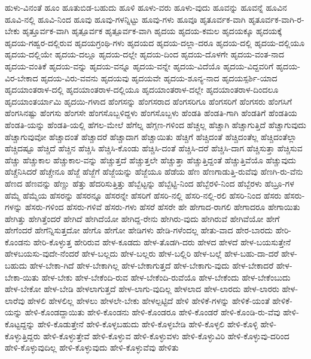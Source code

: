 {ಹುಳು-ವಿನಂತೆ
ಹೂಂ
ಹೂತುಬಿಡ-ಬಹುದು
ಹೂಳಿ
ಹೂಳು-ವರು
ಹೂಳು-ವುದು
ಹೂವನ್ನು
ಹೂವನ್ನೆ
ಹೂವಿನ
ಹೂವಿ-ನಲ್ಲಿ
ಹೂವಿ-ನಿಂದ
ಹೂವು
ಹೂವು-ಗಳನ್ನಿಟ್ಟು
ಹೂವು-ಗಳು
ಹೂವೂ
ಹೃತೂರ್ವಕ-ವಾಗಿ
ಹೃತೂರ್ವಕ-ವಾಗಿ-ರ-ಬೇಕು
ಹೃತ್ತೂರ್ವಕ-ವಾಗಿ
ಹೃತ್ಪೂರ್ವಕ
ಹೃತ್ಪೂರ್ವಕ-ವಾಗಿ
ಹೃದಯ
ಹೃದಯ-ಕಮಲ
ಹೃದಯಕ್ಕೂ
ಹೃದಯಕ್ಕೆ
ಹೃದಯ-ಗಹ್ವರ-ದಲ್ಲಿರುವ
ಹೃದಯಗ್ರಂಥಿ-ಗಳು
ಹೃದಯದ
ಹೃದಯ-ದಲ್ಲಾ-ದರೂ
ಹೃದಯ-ದಲ್ಲಿ
ಹೃದಯ-ದಲ್ಲಿಯೂ
ಹೃದಯ-ದಲ್ಲಿಯೇ
ಹೃದಯ-ದಲ್ಲೂ
ಹೃದಯ-ದಲ್ಲೇ
ಹೃದಯ-ದಿಂದ
ಹೃದಯ-ದೊಳಗೇ
ಹೃದಯ-ವಂತ-ನಾದ
ಹೃದಯ-ವಂತಿಕೆ
ಹೃದಯ-ವನ್ನು
ಹೃದಯ-ವನ್ನೂ
ಹೃದಯ-ವನ್ನೇ
ಹೃದಯ-ವಿದೆಯೊ
ಹೃದಯ-ವಿದ್ದವರಿಗೆ
ಹೃದಯ-ವಿರ-ಬೇಕಾದ
ಹೃದಯ-ವಿರು-ವವನು
ಹೃದಯವು
ಹೃದಯವೇ
ಹೃದಯ-ಶೂನ್ಯ-ನಾದ
ಹೃದಯಸ್ಪರ್ಶಿ-ಯಾದ
ಹೃದಯಾಂತರಾಳ-ದಲ್ಲಿ
ಹೃದಯಾಂತರಾಳ-ದಲ್ಲಿಯೂ
ಹೃದಯಾಂತರಾಳ-ದಲ್ಲೇ
ಹೃದಯಾಂತರಾಳ-ದಿಂದಲೂ
ಹೃದಯಾಂತರ್ಯಾಮಿ
ಹೃದಯಿ-ಗಳಾದ
ಹೆಂಗಸನ್ನು
ಹೆಂಗಸರಾದ
ಹೆಂಗಸರಿಗೂ
ಹೆಂಗಸರಿಗೆ
ಹೆಂಗಸರು
ಹೆಂಗಸಿಗೆ
ಹೆಂಗಸಿನಷ್ಟು
ಹೆಂಗಸು
ಹೆಂಗಸೇ
ಹೆಂಗಸೊಬ್ಬಳಿದ್ದಳು
ಹೆಂಗಸೊಬ್ಬಳು
ಹೆಂಡತಿ
ಹೆಂಡತಿ-ಗಾಗಿ
ಹೆಂಡತಿಗೆ
ಹೆಂಡತಿಯ
ಹೆಂಡತಿ-ಯನ್ನು
ಹೆಂಡತಿ-ಯಲ್ಲಿ
ಹೆಗಲ-ಮೇಲೆ
ಹೆಗೆಲ್ನ
ಹೆಗ್ಗಣ-ಗಳಿಂದ
ಹೆಚ್ಚಲ್ಲ
ಹೆಚ್ಚಾಗಿ
ಹೆಚ್ಚಾಗುತ್ತಿದೆ
ಹೆಚ್ಚಾಗುವುದು
ಹೆಚ್ಚಾಗುವುವೋ
ಹೆಚ್ಚಾದಂತೆ
ಹೆಚ್ಚಾದರೆ
ಹೆಚ್ಚಾದಾಗ
ಹೆಚ್ಚಾಯಿತು
ಹೆಚ್ಚಿಗೆ
ಹೆಚ್ಚಿದಂತೆ
ಹೆಚ್ಚಿದಂತೆಲ್ಲ
ಹೆಚ್ಚಿದಂತೆಲ್ಲಾ
ಹೆಚ್ಚಿದಷ್ಟೂ
ಹೆಚ್ಚಿದೆ
ಹೆಚ್ಚಿನ
ಹೆಚ್ಚಿಸಿ
ಹೆಚ್ಚಿಸಿ-ಕೊಂಡು
ಹೆಚ್ಚಿಸಿ-ದಂತೆ
ಹೆಚ್ಚಿಸಿ-ದರೆ
ಹೆಚ್ಚಿಸಿ-ದಾಗ
ಹೆಚ್ಚಿಸುತ್ತಾ
ಹೆಚ್ಚಿಸುವ
ಹೆಚ್ಚು
ಹೆಚ್ಚುಕಾಲ
ಹೆಚ್ಚುಕಾಲ-ವನ್ನು
ಹೆಚ್ಚುತ್ತದೆ
ಹೆಚ್ಚುತ್ತಲೇ
ಹೆಚ್ಚುತ್ತಾ
ಹೆಚ್ಚುತ್ತಿದ್ದಂತೆ
ಹೆಚ್ಚುತ್ತಿವೆಯೊ
ಹೆಚ್ಚುವುದು
ಹೆಚ್ಚೆನಿಸಿದರೆ
ಹೆಚ್ಚೇನೂ
ಹೆಜ್ಜೆ
ಹೆಜ್ಜೆಗೆ
ಹೆಜ್ಜೆಯನ್ನು
ಹೆಜ್ಜೆಯೂ
ಹೆಡೆಯ
ಹೆಣ
ಹೆಣಗಾಡುತ್ತಿ-ರುವೆವು
ಹೆಣಗಿ-ರು-ವೆನು
ಹೆಣದ
ಹೆಣವನ್ನು
ಹೆಣ್ಣು
ಹೆತ್ತು
ಹೆದರಿಸುತ್ತಿತ್ತು
ಹೆಬ್ಬೆಟ್ಟನ್ನು
ಹೆಬ್ಬೆಟ್ಟಿ-ನಿಂದ
ಹೆಬ್ಬೆರಳಿ-ನಿಂದ
ಹೆಬ್ಬೆರಳು
ಹೆಬ್ರೂ-ಗಳ
ಹೆಮ್ಮೆ
ಹೆಮ್ಮೆಯ
ಹೆಸರನ್ನು
ಹೆಸರನ್ನೂ
ಹೆಸರನ್ನೇ
ಹೆಸರಿಗೆ
ಹೆಸರಿ-ನಲ್ಲಿ
ಹೆಸರಿ-ನಲ್ಲಿ-ರಲಿ
ಹೆಸರಿ-ನಿಂದ
ಹೆಸರು
ಹೆಸರು-ಗಳನ್ನು
ಹೆಸರು-ಗಳಿಂದ
ಹೆಸರು-ಗಳಿವೆ
ಹೆಸರು-ಗಳು
ಹೆಸರೆ
ಹೆಸರೇ
ಹೇ
ಹೇಗಾದ-ರಾಗಲಿ
ಹೇಗಾದರೂ
ಹೇಗಾಯಿತು
ಹೇಗಿತ್ತು
ಹೇಗಿತ್ತೆಂದರೆ
ಹೇಗಿದೆ
ಹೇಗಿದೆಯೋ
ಹೇಗಿದ್ದ-ರೇನು
ಹೇಗಿರು-ವುದು
ಹೇಗಿರುವೆ
ಹೇಗಿವೆಯೋ
ಹೇಗೆ
ಹೇಗೆಂದರೆ
ಹೇಗೆನ್ನಿಸುತ್ತದೋ
ಹೇಗೊ
ಹೇಗೋ
ಹೇಡಿಗಳು
ಹೇಡಿ-ಗಳೆಂದಲ್ಲ
ಹೇತು-ವಾದ
ಹೇರ-ಬಾರದು
ಹೇರಿ-ಕೊಂಡನು
ಹೇರಿ-ಕೊಳ್ಳುತ್ತ
ಹೇರಿರುವ
ಹೇಳ-ಕೂಡದು
ಹೇಳ-ತೊಡಗಿ-ದರು
ಹೇಳದ
ಹೇಳದೆ
ಹೇಳ-ಬಯಸುತ್ತೇನೆ
ಹೇಳಬಯಸು-ವುದೇ-ನೆಂದರೆ
ಹೇಳ-ಬಲ್ಲದು
ಹೇಳ-ಬಲ್ಲರು
ಹೇಳ-ಬಲ್ಲಿರಿ
ಹೇಳ-ಬಲ್ಲೆ
ಹೇಳ-ಬಹು-ದಾ-ದರೆ
ಹೇಳ-ಬಹುದು
ಹೇಳ-ಬೇಕಾ-ಗಿದೆ
ಹೇಳ-ಬೇಕಾಗಿಲ್ಲ
ಹೇಳ-ಬೇಕಾಗುತ್ತದೆ
ಹೇಳ-ಬೇಕಾಗು-ವುದು
ಹೇಳ-ಬೇಕಾದರೆ
ಹೇಳ-ಬೇಕಾ-ಯಿತು
ಹೇಳ-ಬೇಕು
ಹೇಳ-ಬೇಕೆಂದಿ-ರುವ
ಹೇಳ-ಬೇಕೆಂದಿ-ರುವೆಯೊ
ಹೇಳ-ಬೇಕೆಂದು
ಹೇಳ-ಬೇಕೆಂಬುದು
ಹೇಳ-ಬೇಕೋ
ಹೇಳ-ಬೇಡಿ
ಹೇಳಲಾಗುತ್ತದೆ
ಹೇಳ-ಲಾಗು-ವುದಿಲ್ಲ
ಹೇಳಲಾದ
ಹೇಳ-ಲಾರದು
ಹೇಳ-ಲಾರರು
ಹೇಳ-ಲಾರೆವು
ಹೇಳಲಿ
ಹೇಳಲಿಲ್ಲ
ಹೇಳಲು
ಹೇಳಲೇ-ಬೇಕು
ಹೇಳಲ್ಪಟ್ಟಿದೆ
ಹೇಳಿ
ಹೇಳಿಕೆ-ಗಳನ್ನು
ಹೇಳಿಕೆ-ಯಂತೆ
ಹೇಳಿಕೆ-ಯನ್ನು
ಹೇಳಿ-ಕೊಂಡದ್ದಾಯಿತು
ಹೇಳಿ-ಕೊಂಡನು
ಹೇಳಿ-ಕೊಂಡರೂ
ಹೇಳಿ-ಕೊಂಡರೆ
ಹೇಳಿ-ಕೊಂಡಿ-ರು-ವೆವು
ಹೇಳಿ-ಕೊಟ್ಟದ್ದನ್ನು
ಹೇಳಿ-ಕೊಡುತ್ತೇನೆ
ಹೇಳಿ-ಕೊಳ್ಳಬಹುದು
ಹೇಳಿ-ಕೊಳ್ಳಬೇಡಿ
ಹೇಳಿ-ಕೊಳ್ಳಲಿ
ಹೇಳಿ-ಕೊಳ್ಳಿ
ಹೇಳಿ-ಕೊಳ್ಳುತ್ತಿದ್ದರು
ಹೇಳಿ-ಕೊಳ್ಳುತ್ತೇವೆ
ಹೇಳಿ-ಕೊಳ್ಳುವ
ಹೇಳಿ-ಕೊಳ್ಳುವಳು
ಹೇಳಿ-ಕೊಳ್ಳುವಿರಿ
ಹೇಳಿ-ಕೊಳ್ಳುವು-ದರಿಂದ
ಹೇಳಿ-ಕೊಳ್ಳುವುದಿಲ್ಲ
ಹೇಳಿ-ಕೊಳ್ಳುವುದು
ಹೇಳಿ-ಕೊಳ್ಳುವೆವು
ಹೇಳಿತು
}
